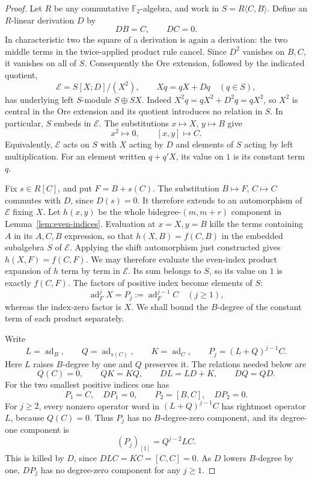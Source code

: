 \documentclass[11pt]{article}
\theoremstyle{definition}
\theoremstyle{remark}
\numberwithin{equation}{section}
\begin{document}
\begin{proof}
Let $R$ be any commutative ${\mathbb F_2}$-algebra, and work in
$S=R\langle C,B\rangle$.  Define an $R$-linear derivation $D$ by
\[
 DB=C,\qquad DC=0.
\]
In characteristic two the square of a derivation is again a
derivation: the two middle terms in the twice-applied product rule
cancel.  Since $D^2$ vanishes on $B,C$, it vanishes on all of $S$.
Consequently the Ore extension, followed by the indicated quotient,
\[
 \mathcal E=S[X;D]/(X^2),\qquad Xq=qX+Dq\quad(q\in S),
\]
has underlying left $S$-module $S\oplus SX$.
Indeed $X^2q=qX^2+D^2q=qX^2$, so $X^2$ is central in the Ore
extension and its quotient introduces no relation in $S$.
In particular, $S$ embeds in $\mathcal E$.
The substitutions $x\mapsto X$, $y\mapsto B$ give
\[
 x^2\mapsto0,\qquad [x,y]\mapsto C.
\]
Equivalently, $\mathcal E$ acts on $S$ with $X$ acting by $D$
and elements of $S$ acting by left multiplication.
For an element written $q+q'X$, its value on $1$ is its constant
term $q$.

Fix $s\in R[C]$, and put $F=B+s(C)$.
The substitution $B\mapsto F$, $C\mapsto C$ commutes with $D$,
since $D(s)=0$.  It therefore extends to an automorphism of
$\mathcal E$ fixing $X$.
Let $h(x,y)$ be the whole bidegree-$(m,m+r)$ component in
Lemma~\ref{lem:even-indices}.  Evaluation at $x=X,y=B$ kills the
terms containing $A$ in its $A,C,B$ expression, so that
$h(X,B)=f(C,B)$ in the embedded subalgebra $S$ of $\mathcal E$.
Applying the shift automorphism just constructed gives
$h(X,F)=f(C,F)$.  We may therefore evaluate the even-index product
expansion of $h$ term by term in $\mathcal E$.  Its sum belongs to
$S$, so its value on $1$ is exactly $f(C,F)$.
The factors of positive index become elements of $S$:
\[
 \operatorname{ad}_F^jX=P_j:=\operatorname{ad}_F^{j-1}C\quad(j\geq1),
\]
whereas the index-zero factor is $X$.
We shall bound the $B$-degree of the constant term of each product
separately.

Write
\[
 L=\operatorname{ad}_B,\qquad Q=\operatorname{ad}_{s(C)},\qquad K=\operatorname{ad}_C,
 \qquad P_j=(L+Q)^{j-1}C.
\]
Here $L$ raises $B$-degree by one and $Q$ preserves it.
The relations needed below are
\[
 Q(C)=0,\qquad QK=KQ,\qquad DL=LD+K,\qquad DQ=QD.
\]
For the two smallest positive indices one has
\begin{equation}
 \label{eq:small-indices}
 P_1=C,\quad DP_1=0,\qquad
 P_2=[B,C],\quad DP_2=0.
\end{equation}
For $j\geq2$, every nonzero operator word in $(L+Q)^{j-1}C$
has rightmost operator $L$, because $Q(C)=0$.
Thus $P_j$ has no $B$-degree-zero component, and its degree-one
component is
\[
 (P_j)_{[1]}=Q^{j-2}LC.
\]
This is killed by $D$, since $DLC=KC=[C,C]=0$.
As $D$ lowers $B$-degree by one, $DP_j$ has no degree-zero
component for any $j\geq1$.


\end{proof}
\end{document}
